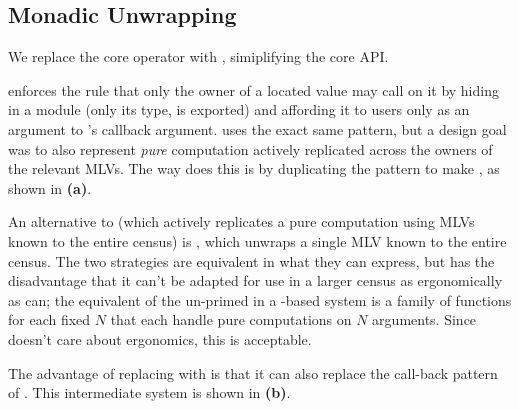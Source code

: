\subsection{Monadic Unwrapping}
\label{sec:minichor-stg1}
We replace the core operator  with , simiplifying the core API.

\HasChor enforces the rule that only the owner of a located value may call  on it
by hiding  in a module (only its type,  is exported)
and affording it to users only as an argument to 's callback argument.
\MultiChor uses the exact same pattern, but a design goal was to also represent \emph{pure} computation
actively replicated across the owners of the relevant MLVs.
The way \MultiChor does this is by duplicating the  pattern
to make ,
as shown in \textbf{(a)}.

An alternative to 
(which actively replicates a pure computation using MLVs known to the entire census)
is ,
which unwraps a single MLV known to the entire census.
The two strategies are equivalent in what they can express,
but  has the disadvantage that it can't be adapted for use in a larger census as ergonomically as  can;
the equivalent of the un-primed  in a -based system is a family of
functions for each fixed $N$ that each handle pure computations on $N$ arguments.
Since \minichor doesn't care about ergonomics, this is acceptable.

The advantage of replacing  with  is that it can also replace the call-back pattern of .
This intermediate system is shown in \textbf{(b)}.

